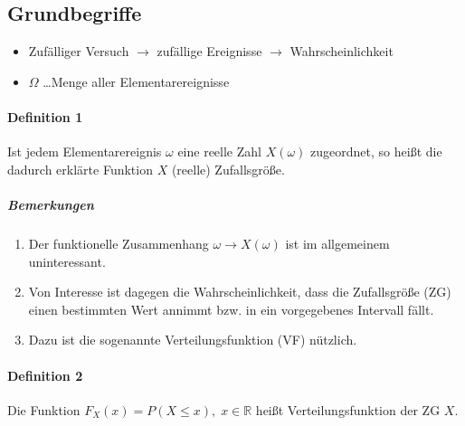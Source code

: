 \documentclass[a4paper]{scrartcl}
\begin{document}
\subsection{Grundbegriffe}
\begin{itemize}
\item Zufälliger Versuch $\rightarrow$ zufällige Ereignisse $\rightarrow$ Wahrscheinlichkeit
\item $\Omega$ \dots Menge aller Elementarereignisse
\end{itemize}

\paragraph{Definition 1} Ist jedem Elementarereignis $\omega$ eine reelle Zahl $X (\omega)$ zugeordnet, so heißt die dadurch erklärte Funktion $X$ (reelle) Zufallsgröße.

\subparagraph{Bemerkungen}
\begin{enumerate}
\item Der funktionelle Zusammenhang $\omega \rightarrow X (\omega)$ ist im allgemeinem uninteressant.
\item Von Interesse ist dagegen die Wahrscheinlichkeit, dass die Zufallsgröße (ZG) einen bestimmten Wert annimmt bzw. in ein vorgegebenes Intervall fällt.
\item Dazu ist die sogenannte Verteilungsfunktion (VF) nützlich.
\end{enumerate}

\paragraph{Definition 2} Die Funktion $F_X (x) = P(X \leq x), \; x \in \mathbb{R}$ heißt Verteilungsfunktion der ZG $X$.
\end{document}
